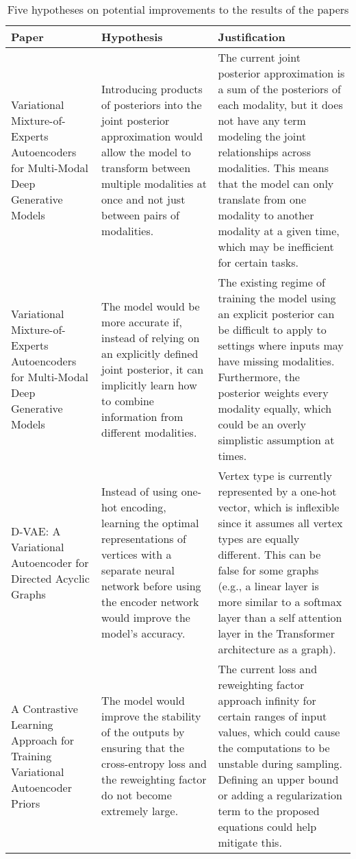 \documentclass{article}
\begin{document}
\begin{table}[ht]
\centering
\caption{Five hypotheses on potential improvements to the results of the papers}
\begin{tabularx}{\textwidth}{p{3.3cm}XX}
    \toprule \textbf{Paper} & \textbf{Hypothesis} & \textbf{Justification} \\ \hline
    Variational Mixture-of-Experts Autoencoders for Multi-Modal Deep Generative Models &
    Introducing products of posteriors into the joint posterior approximation would allow the model to transform between multiple modalities at once and not just between pairs of modalities. &
    The current joint posterior approximation is a sum of the posteriors of each modality, but it does not have any term modeling the joint relationships across modalities. This means that the model can only translate from one modality to another modality at a given time, which may be inefficient for certain tasks. \\ \hline
    Variational Mixture-of-Experts Autoencoders for Multi-Modal Deep Generative Models &
    The model would be more accurate if, instead of relying on an explicitly defined joint posterior, it can implicitly learn how to combine information from different modalities. &
    The existing regime of training the model using an explicit posterior can be difficult to apply to settings where inputs may have missing modalities. Furthermore, the posterior weights every modality equally, which could be an overly simplistic assumption at times. \\ \hline
    D-VAE: A Variational Autoencoder for Directed Acyclic Graphs &
    Instead of using one-hot encoding, learning the optimal representations of vertices with a separate neural network before using the encoder network would improve the model's accuracy. &
    Vertex type is currently represented by a one-hot vector, which is inflexible since it assumes all vertex types are equally different. This can be false for some graphs (e.g., a linear layer is more similar to a softmax layer than a self attention layer in the Transformer architecture as a graph). \\ \hline
    A Contrastive Learning Approach for Training Variational Autoencoder Priors &
    The model would improve the stability of the outputs by ensuring that the cross-entropy loss and the reweighting factor do not become extremely large. &
    The current loss and reweighting factor approach infinity for certain ranges of input values, which could cause the computations to be unstable during sampling. Defining an upper bound or adding a regularization term to the proposed equations could help mitigate this. \\ \hline

\end{tabularx}
\end{table}
\end{document}
